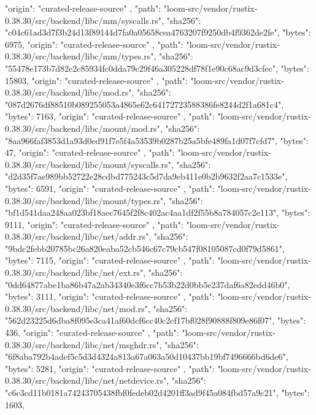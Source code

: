 {{      "origin": "curated-release-source"
    },
    {
      "path": "loom-src/vendor/rustix-0.38.30/src/backend/libc/mm/syscalls.rs",
      "sha256": "c04c61ad3d7f3b24d13f89144d7fa0a05658cea4763207f9250db4f9362de2fe",
      "bytes": 6975,
      "origin": "curated-release-source"
    },
    {
      "path": "loom-src/vendor/rustix-0.38.30/src/backend/libc/mm/types.rs",
      "sha256": "55478e173b7d82e2c85934fc0dda79c29f46a305228df78f1e90c68ac9d3cfec",
      "bytes": 15803,
      "origin": "curated-release-source"
    },
    {
      "path": "loom-src/vendor/rustix-0.38.30/src/backend/libc/mod.rs",
      "sha256": "087d2676df88510b089255053a4865e62c64172723588386fe8244d2f1a681c4",
      "bytes": 7163,
      "origin": "curated-release-source"
    },
    {
      "path": "loom-src/vendor/rustix-0.38.30/src/backend/libc/mount/mod.rs",
      "sha256": "8aa966faf3853d1a93d0ed91f7e5f4a53539b0287b25a5bfe489fa1d07f7cfd7",
      "bytes": 47,
      "origin": "curated-release-source"
    },
    {
      "path": "loom-src/vendor/rustix-0.38.30/src/backend/libc/mount/syscalls.rs",
      "sha256": "d2d35f7ae989bb52722e28cdbd775243c5d7da9eb411e0b2b9632f2aa7c1533e",
      "bytes": 6591,
      "origin": "curated-release-source"
    },
    {
      "path": "loom-src/vendor/rustix-0.38.30/src/backend/libc/mount/types.rs",
      "sha256": "bf1d541daa248aa023bf18aec7645f2f8c402ac4aa1df2f55b8a784057c2e113",
      "bytes": 9111,
      "origin": "curated-release-source"
    },
    {
      "path": "loom-src/vendor/rustix-0.38.30/src/backend/libc/net/addr.rs",
      "sha256": "9bdc2febb20785bc26a820eaba52cb546c67c79cb547f08105087cd0f79d5861",
      "bytes": 7115,
      "origin": "curated-release-source"
    },
    {
      "path": "loom-src/vendor/rustix-0.38.30/src/backend/libc/net/ext.rs",
      "sha256": "0dd64877abe1ba86b47a2ab34340e3f6cc7b53b22d0bb5e237daf6a82edd46b0",
      "bytes": 3111,
      "origin": "curated-release-source"
    },
    {
      "path": "loom-src/vendor/rustix-0.38.30/src/backend/libc/net/mod.rs",
      "sha256": "562d23225d6dba8f095e3ca41af60dcf6cc40c2cf17bf028f90888f809e86f07",
      "bytes": 436,
      "origin": "curated-release-source"
    },
    {
      "path": "loom-src/vendor/rustix-0.38.30/src/backend/libc/net/msghdr.rs",
      "sha256": "6f8aba792b4adef5c5d3d4324a813a67a063a50d10437bb19bf7496666bd6de6",
      "bytes": 5281,
      "origin": "curated-release-source"
    },
    {
      "path": "loom-src/vendor/rustix-0.38.30/src/backend/libc/net/netdevice.rs",
      "sha256": "c6c3cd11b0181a74243705438fbf0fedeb02d4201ff3ad9f45a084fbd57a9c21",
      "bytes": 1603,
}}
